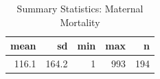 \begin{table}

\caption{Summary Statistics: Maternal Mortality}
\centering
\begin{tabular}[t]{rrrrr}
\toprule
mean & sd & min & max & n\\
\midrule
116.1 & 164.2 & 1 & 993 & 194\\
\bottomrule
\end{tabular}
\end{table}
